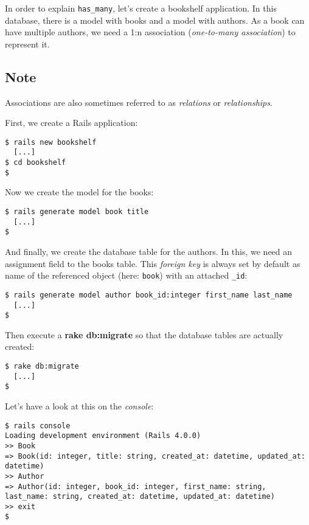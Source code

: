 \documentclass[a4paper]{book}
\newcounter{tab}[chapter]
\begin{document}
In order to explain \texttt{has\_many}, let's create a bookshelf application. In this database, there is a model with books and a model with authors. As a book can have multiple authors, we need a 1:n association (\emph{one-to-many association}) to represent it.

\subsection{Note}\label{note-25}

Associations are also sometimes referred to as \emph{relations} or \emph{relationships}.

First, we create a Rails application:

\begin{shaded}\begin{verbatim}
$ rails new bookshelf
  [...]
$ cd bookshelf
$
\end{verbatim}\end{shaded}

Now we create the model for the books:

\begin{shaded}\begin{verbatim}
$ rails generate model book title
  [...]
$
\end{verbatim}\end{shaded}

And finally, we create the database table for the authors. In this, we need an assignment field to the books table. This \emph{foreign key} is always set by default as name of the referenced object (here: \texttt{book}) with an attached \texttt{\_id}:

\begin{shaded}\begin{verbatim}
$ rails generate model author book_id:integer first_name last_name
  [...]
$
\end{verbatim}\end{shaded}

Then execute a \textbf{rake db:migrate} so that the database tables are actually created:

\begin{shaded}\begin{verbatim}
$ rake db:migrate
  [...]
$
\end{verbatim}\end{shaded}

Let's have a look at this on the \emph{console}:

\begin{shaded}\begin{verbatim}
$ rails console
Loading development environment (Rails 4.0.0)
>> Book
=> Book(id: integer, title: string, created_at: datetime, updated_at: datetime)
>> Author
=> Author(id: integer, book_id: integer, first_name: string, last_name: string, created_at: datetime, updated_at: datetime)
>> exit
$
\end{verbatim}\end{shaded}
\end{document}
